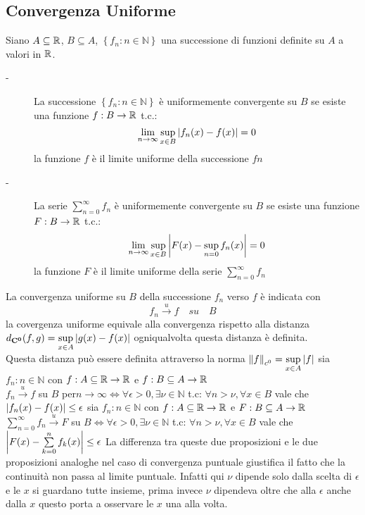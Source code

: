 \subsection{Convergenza Uniforme}
Siano $A\subseteq \mathbb{R}$, $B\subseteq A$, $\left\{f_n:n\in\mathbb{N}\right\}$ una successione di funzioni definite su $A$ a  valori in $ \mathbb{R}$.
\begin{description}
	\item[-] La successione $\left\{f_n:n\in\mathbb{N}\right\}$ è uniformemente convergente su $B$ se esiste una funzione $f:B\to \mathbb{R}$ t.c.:
	$$\lim\limits_{n\to\infty} \sup\limits_{x\in B}\left|f_n(x)-f(x)\right|=0$$
	la funzione $f$ è il limite uniforme della successione $fn$
	\item[-] La serie $\sum\limits_{n=0}^{\infty}f_n$ è uniformemente convergente su $B$ se esiste una funzione $F:B\to \mathbb{R}$ t.c.:
	$$\lim\limits_{n\to\infty} \sup\limits_{x\in B}\left|F(x)-\sup\limits_{n=0}f_n(x)\right|=0$$
	la funzione $F$ è il limite uniforme della serie $\sum\limits_{n=0}^{\infty}f_n$ 
\end{description}
\observation
La convergenza uniforme su $B$ della successione $f_n$ verso $f$ è indicata con
$$f_n\overset{u}{\to}f\quad su \quad B$$
\observation
la covergenza uniforme equivale alla convergenza rispetto alla distanza $d_{\mathbf{C^{0}}}(f,g)=\sup\limits_{x\in A}\left|g(x)-f(x)\right|$ ogniqualvolta questa distanza è definita.\\
Questa distanza può essere definita attraverso la norma $\left\|f\right\|_{c^0}=\sup\limits_{x\in A}\left|f\right|$
\proposition
sia $f_n:n\in\mathbb{N}$ con $f:A\subseteq \mathbb{R}\to \mathbb{R}$ e $f:B\subseteq A \to  \mathbb{R}$\\
$f_n\overset{u}{\to}f$ su $B$ per$n\to\infty \Leftrightarrow \forall\epsilon >0, \exists\nu\in\mathbb{N}$  t.c: $\forall n>\nu, \forall x\in B$ vale che $\left|f_n(x)-f(x)\right|\le\epsilon$
\proposition
sia $f_n:n\in\mathbb{N}$ con $f:A\subseteq \mathbb{R}\to \mathbb{R}$ e $F:B\subseteq A \to  \mathbb{R}$\\
$\sum\limits_{n=0}^{\infty}f_n\overset{u}{\to}F$ su $B\Leftrightarrow \forall\epsilon >0, \exists\nu\in\mathbb{N}$  t.c: $\forall n>\nu, \forall x\in B$ vale che $\left|F(x)-\sum\limits_{k=0}^{n}f_k(x)\right|\le\epsilon$
\observation
La differenza tra queste due proposizioni e le due proposizioni analoghe nel caso di convergenza puntuale giustifica il fatto che la continuità non passa al limite puntuale. Infatti qui $\nu$ dipende solo dalla scelta di $\epsilon$ e le $x$ si guardano tutte insieme, prima invece $\nu$ dipendeva oltre che alla $\epsilon$ anche dalla $x$ questo porta a osservare le $x$ una alla volta.
